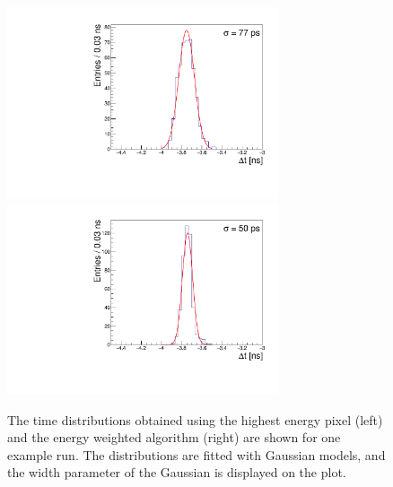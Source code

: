 \begin{figure}[h] 
\centering
\includegraphics[width=8cm]{Images/exdt/exdtHI.pdf}
\includegraphics[width=8cm]{Images/exdt/exdtWI.pdf} 
\caption{\small The time distributions obtained using the highest energy pixel (left) and the energy weighted algorithm (right) are shown for one example run. The distributions are
fitted with Gaussian models, and the width parameter of the Gaussian is
displayed on the plot.} 
\label{fig:exdt} 
\end{figure} 

